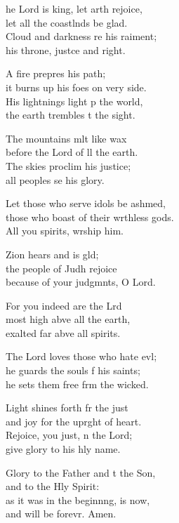 \settowidth{\versewidth}{those who boast of their worthless gods. *}
\begin{psalmverse}%
  \begin{patverse}
    he Lord is king, let arth rejoice,\Med\\
let all the coastlnds be glad.\\
Cloud and darkness re his raiment;\Med\\
his throne, just\pointup{\i}ce and right.

A fire prepres his path;\Med\\
it burns up his foes on very side.\\
His lightnings light p the world,\Med\\
the earth trembles t the sight.

The mountains mlt like wax\Med\\
before the Lord of ll the earth.\\
The skies proclim his justice;\Med\\
all peoples se his glory.

Let those who serve idols be ashmed,\Flex\\
those who boast of their wrthless gods.\Med\\
All you spirits, wrship him.

Zion hears and is gld;\Flex\\
the people of Judh rejoice\Med\\
because of your judgmnts, O Lord.

For you indeed are the Lrd\Flex\\
most high abve all the earth,\Med\\
exalted far abve all spirits.

The Lord loves those who hate ev\pointup{\i}l;\Flex\\
he guards the souls f his saints;\Med\\
he sets them free frm the wicked.

Light shines forth fr the just\Med\\
and joy for the upr\pointup{\i}ght of heart.\\
Rejoice, you just, \pointup{\i}n the Lord;\Med\\
give glory to his hly name.

Glory to the Father and t the Son,\Med\\
and to the Hly Spirit:\\
as it was in the beginn\pointup{\i}ng, is now,\Med\\
and will be forevr. Amen.
  \end{patverse}
\end{psalmverse}
